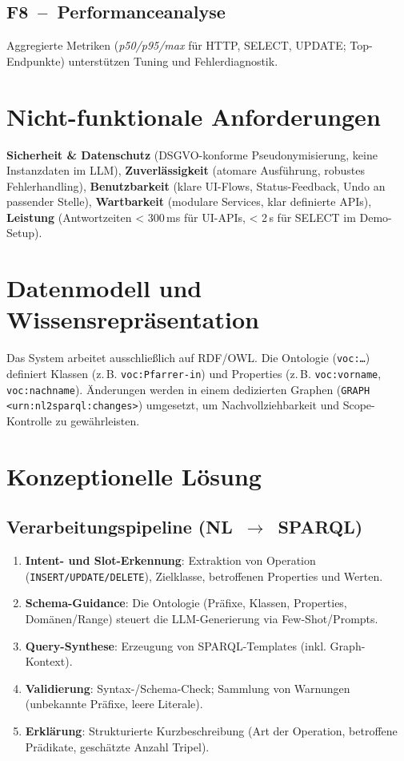 \subsection*{F8~–~Performanceanalyse}
Aggregierte Metriken (\emph{p50/p95/max} für HTTP, SELECT, UPDATE; Top-Endpunkte) unterstützen Tuning und Fehlerdiagnostik.

\section{Nicht-funktionale Anforderungen}
\textbf{Sicherheit \& Datenschutz} (DSGVO-konforme Pseudonymisierung, keine Instanzdaten im LLM), \textbf{Zuverlässigkeit} (atomare Ausführung, robustes Fehlerhandling), \textbf{Benutzbarkeit} (klare UI-Flows, Status-Feedback, Undo an passender Stelle), \textbf{Wartbarkeit} (modulare Services, klar definierte APIs), \textbf{Leistung} (Antwortzeiten \textless{} 300\,ms für UI-APIs, \textless{} 2\,s für SELECT im Demo-Setup).

\section{Datenmodell und Wissensrepräsentation}
Das System arbeitet ausschließlich auf RDF/OWL. Die Ontologie (\texttt{voc:\ldots}) definiert Klassen (z.\,B. \texttt{voc:Pfarrer-in}) und Properties (z.\,B. \texttt{voc:vorname}, \texttt{voc:nachname}). Änderungen werden in einem dedizierten Graphen (\texttt{GRAPH <urn:nl2sparql:changes>}) umgesetzt, um Nachvollziehbarkeit und Scope-Kontrolle zu gewährleisten.

\section{Konzeptionelle Lösung}
\subsection{Verarbeitungspipeline (NL~$\rightarrow$~SPARQL)}
\begin{enumerate}
  \item \textbf{Intent- und Slot-Erkennung}: Extraktion von Operation (\texttt{INSERT/UPDATE/DELETE}), Zielklasse, betroffenen Properties und Werten.
  \item \textbf{Schema-Guidance}: Die Ontologie (Präfixe, Klassen, Properties, Domänen/Range) steuert die LLM-Generierung via Few-Shot/Prompts.
  \item \textbf{Query-Synthese}: Erzeugung von SPARQL-Templates (inkl. Graph-Kontext).
  \item \textbf{Validierung}: Syntax-/Schema-Check; Sammlung von Warnungen (unbekannte Präfixe, leere Literale).
  \item \textbf{Erklärung}: Strukturierte Kurzbeschreibung (Art der Operation, betroffene Prädikate, geschätzte Anzahl Tripel).
\end{enumerate}

